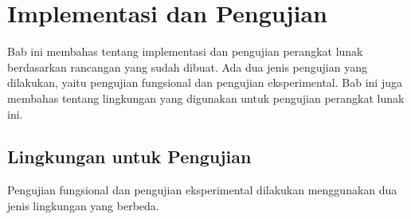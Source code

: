 \chapter{Implementasi dan Pengujian}
\label{chap:implementasi dan pengujian}

Bab ini membahas tentang implementasi dan pengujian perangkat lunak berdasarkan rancangan yang sudah dibuat. Ada dua jenis pengujian yang dilakukan, yaitu pengujian fungsional dan pengujian eksperimental. Bab ini juga membahas tentang lingkungan yang digunakan untuk pengujian perangkat lunak ini.

\section{Lingkungan untuk Pengujian}
Pengujian fungsional dan pengujian eksperimental dilakukan menggunakan dua jenis lingkungan yang berbeda. 

